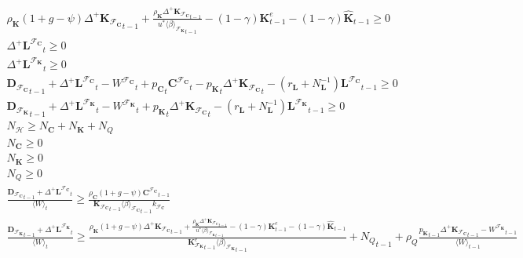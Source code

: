 \documentclass[a4paper, headings=standardclasses]{scrartcl}
\numberwithin{equation}{subsection}
\begin{document}
{\begin{gather}
		\rho_\mathbf{K} (1 + g - \psi){\Delta^+\mathbf{K}_{\mathcal{F}_\mathbf{C}}}_{t-1} +  \frac{\rho_\mathbf{K} {\Delta^+\mathbf{K}_{\mathcal{F}_\mathbf{C}}}_{t-1}}{u^* {\langle \beta \rangle_{\mathcal{F}_\mathbf{K}}}_{t-1}} - (1-\gamma) \mathbf{K}^e_{t-1} - (1-\gamma)\hat{\mathbf{K}}_{t-1} \ge 0 \\
		{\Delta^+{\mathbf{L}^{\mathcal{F}_\mathbf{C}}}}_t \ge 0 \\
		{\Delta^+{\mathbf{L}^{\mathcal{F}_\mathbf{K}}}}_t \ge 0 \\
		{\mathbf{D}_{\mathcal{F}_\mathbf{C}}}_{t-1} + {\Delta^+{\mathbf{L}^{\mathcal{F}_\mathbf{C}}}}_t - {W^{\mathcal{F}_\mathbf{C}}}_t + {p_{\mathbf{C}}}_t {\mathbf{C}^{\mathcal{F}_\mathbf{C}}}_t - {p_{\mathbf{K}}}_t {\Delta^+{\mathbf{K}_{\mathcal{F}_\mathbf{C}}}}_t - (r_\mathbf{L} + N_\mathbf{L}^{-1}) {\mathbf{L}^{\mathcal{F}_\mathbf{C}}}_{t-1} \ge 0 \\
		{\mathbf{D}_{\mathcal{F}_\mathbf{K}}}_{t-1} + {\Delta^+{\mathbf{L}^{\mathcal{F}_\mathbf{K}}}}_t - {W^{\mathcal{F}_\mathbf{K}}}_t +  {p_{\mathbf{K}}}_t {\Delta^+{\mathbf{K}_{\mathcal{F}_\mathbf{C}}}}_t - (r_\mathbf{L} + N_\mathbf{L}^{-1}) {\mathbf{L}^{\mathcal{F}_\mathbf{K}}}_{t-1} \ge 0 \\
		N_\mathcal{H} \ge N_\mathbf{C} + N_\mathbf{K} + N_Q \\
		N_\mathbf{C} \ge 0 \\
		N_\mathbf{K} \ge 0 \\
		N_Q \ge 0 \\
		\frac{{\mathbf{D}_{\mathcal{F}_\mathbf{C}}}_{t-1} + {\Delta^+{\mathbf{L}^{\mathcal{F}_\mathbf{C}}}}_{t}}{{\langle W \rangle}_t} \ge \frac{\rho_\mathbf{C} (1 + g - \psi) {\mathbf{C}^{\mathcal{F}_\mathbf{C}}}_{t-1}}{{\mathbf{K}_{\mathcal{F}_\mathbf{C}}}_{t-1} {\langle \beta \rangle_{\mathcal{F}_\mathbf{C}}}_{t-1} k_{\mathcal{F}_\mathbf{C}}} \\
		\frac{{\mathbf{D}_{\mathcal{F}_\mathbf{K}}}_{t-1} + {\Delta^+{\mathbf{L}^{\mathcal{F}_\mathbf{K}}}}_{t}}{{\langle W \rangle}_t} \ge \frac{\rho_\mathbf{K} (1 + g - \psi){\Delta^+\mathbf{K}_{\mathcal{F}_\mathbf{C}}}_{t-1} + \frac{\rho_\mathbf{K} {\Delta^+\mathbf{K}_{\mathcal{F}_\mathbf{C}}}_{t-1}}{u^* {\langle \beta \rangle_{\mathcal{F}_\mathbf{K}}}_{t-1}} - (1-\gamma) \mathbf{K}^e_{t-1} - (1-\gamma)\hat{\mathbf{K}}_{t-1}}{{\mathbf{K}_{\mathcal{F}_\mathbf{K}}^e}_{t-1} {\langle \beta \rangle_{\mathcal{F}_\mathbf{K}}}_{t-1}} + {N_Q}_{t-1} + \rho_Q \frac{{p_\mathbf{K}}_{t-1} {\Delta^+ \mathbf{K}_{\mathcal{F}_\mathbf{C}}}_{t-1} - {W^{\mathcal{F}_\mathbf{K}}}_{t-1}}{\langle W \rangle_{t-1}}
	\end{gather}
}
\end{document}
